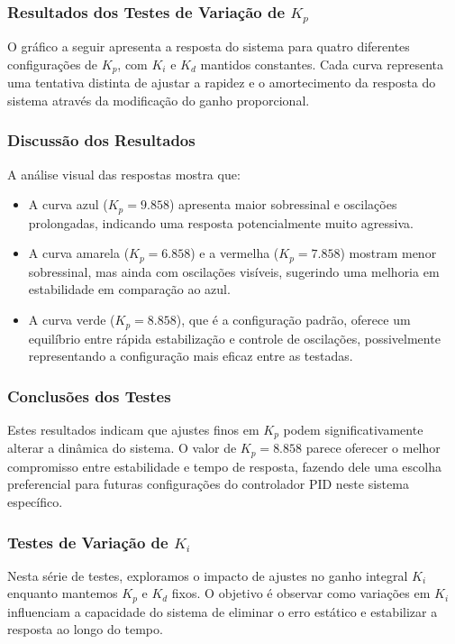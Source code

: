 \subsubsection{Resultados dos Testes de Variação de \( K_p \)}
O gráfico a seguir apresenta a resposta do sistema para quatro diferentes configurações de \( K_p \), com \( K_i \) e \( K_d \) mantidos constantes. Cada curva representa uma tentativa distinta de ajustar a rapidez e o amortecimento da resposta do sistema através da modificação do ganho proporcional.

\subsubsection{Discussão dos Resultados}
A análise visual das respostas mostra que:
\begin{itemize}
    \item A curva azul (\( K_p = 9.858 \)) apresenta maior sobressinal e oscilações prolongadas, indicando uma resposta potencialmente muito agressiva.
    \item A curva amarela (\( K_p = 6.858 \)) e a vermelha (\( K_p = 7.858 \)) mostram menor sobressinal, mas ainda com oscilações visíveis, sugerindo uma melhoria em estabilidade em comparação ao azul.
    \item A curva verde (\( K_p = 8.858 \)), que é a configuração padrão, oferece um equilíbrio entre rápida estabilização e controle de oscilações, possivelmente representando a configuração mais eficaz entre as testadas.
\end{itemize}

\subsubsection{Conclusões dos Testes}
Estes resultados indicam que ajustes finos em \( K_p \) podem significativamente alterar a dinâmica do sistema. O valor de \( K_p = 8.858 \) parece oferecer o melhor compromisso entre estabilidade e tempo de resposta, fazendo dele uma escolha preferencial para futuras configurações do controlador PID neste sistema específico.


\subsubsection{Testes de Variação de \( K_i \)}
Nesta série de testes, exploramos o impacto de ajustes no ganho integral \( K_i \) enquanto mantemos \( K_p \) e \( K_d \) fixos. O objetivo é observar como variações em \( K_i \) influenciam a capacidade do sistema de eliminar o erro estático e estabilizar a resposta ao longo do tempo.
